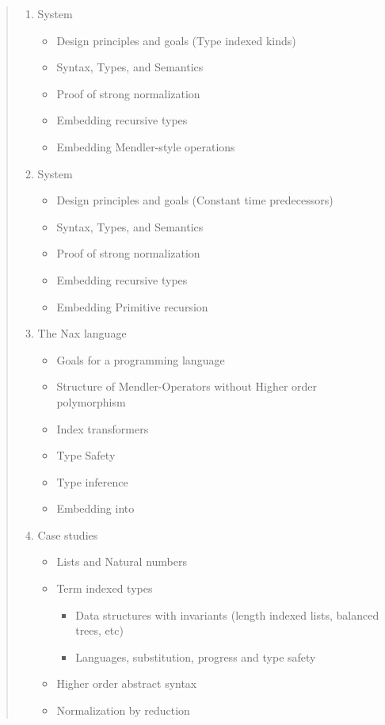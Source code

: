 \begin{quote}
\begin{enumerate}[1.]
\item System \Fi
  \begin{itemize}
     \item Design principles and goals (Type indexed kinds)
     \item Syntax, Types, and Semantics
     \item Proof of strong normalization
     \item Embedding recursive types
     \item Embedding Mendler-style operations
  \end{itemize}
  
\item System \Fixi
  \begin{itemize}
     \item Design principles and goals (Constant time predecessors)
     \item Syntax, Types, and Semantics
     \item Proof of strong normalization
     \item Embedding recursive types
     \item Embedding Primitive recursion
  \end{itemize}
  
\item The Nax language
  \begin{itemize}
    \item Goals for a programming language
    \item Structure of Mendler-Operators without Higher order polymorphism
    \item Index transformers
    \item Type Safety
    \item Type inference
    \item Embedding into \Fixw
  \end{itemize}
  
\item Case studies
  \begin{itemize}
    \item Lists and Natural numbers
    \item Term indexed types
    	\begin{itemize}
    	  \item Data structures with invariants (length indexed lists, balanced trees, etc)
    	  \item Languages, substitution, progress and type safety
    	\end{itemize}
    \item Higher order abstract syntax
    \item Normalization by reduction
  \end{itemize}


\end{enumerate}
\end{quote}

